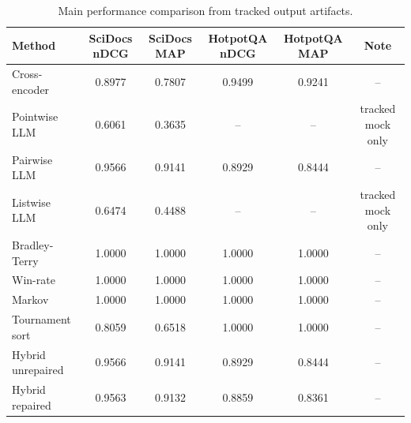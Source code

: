 \begin{table}[t]
\centering
\caption{Main performance comparison from tracked output artifacts.}
\label{tab:main_performance}
\begin{tabular}{lccccc}
\toprule
Method & SciDocs nDCG & SciDocs MAP & HotpotQA nDCG & HotpotQA MAP & Note \\
\midrule
Cross-encoder & 0.8977 & 0.7807 & 0.9499 & 0.9241 & -- \\
Pointwise LLM & 0.6061 & 0.3635 & -- & -- & tracked mock only \\
Pairwise LLM & 0.9566 & 0.9141 & 0.8929 & 0.8444 & -- \\
Listwise LLM & 0.6474 & 0.4488 & -- & -- & tracked mock only \\
Bradley-Terry & 1.0000 & 1.0000 & 1.0000 & 1.0000 & -- \\
Win-rate & 1.0000 & 1.0000 & 1.0000 & 1.0000 & -- \\
Markov & 1.0000 & 1.0000 & 1.0000 & 1.0000 & -- \\
Tournament sort & 0.8059 & 0.6518 & 1.0000 & 1.0000 & -- \\
Hybrid unrepaired & 0.9566 & 0.9141 & 0.8929 & 0.8444 & -- \\
Hybrid repaired & 0.9563 & 0.9132 & 0.8859 & 0.8361 & -- \\
\bottomrule
\end{tabular}
\end{table}
